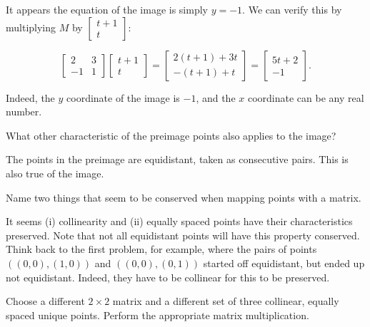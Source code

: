 \documentclass[../key.tex]{subfiles}
\begin{document}
It appears the equation of the image is simply $y=-1$. We can verify this by multiplying $M$ by $\begin{bmatrix} t+1 \\ t \end{bmatrix}$:

$$\begin{bmatrix} 2 & 3 \\ -1 & 1 \end{bmatrix} \begin{bmatrix} t+1 \\ t \end{bmatrix} = \begin{bmatrix} 2(t+1) + 3t \\ -(t+1) + t \end{bmatrix} = \begin{bmatrix} 5t + 2 \\ -1 \end{bmatrix}.$$

Indeed, the $y$ coordinate of the image is $-1$, and the $x$ coordinate can be any real number.

\begin{inner_problem}
\item What other characteristic of the preimage points also applies to the image?
\end{inner_problem}

The points in the preimage are equidistant, taken as consecutive pairs. This is also true of the image.

\begin{inner_problem}
\item Name two things that seem to be conserved when mapping points with a matrix.
\end{inner_problem}

It seems (i) collinearity and (ii) equally spaced points have their characteristics preserved. Note that not all equidistant points will have this property conserved. Think back to the first problem, for example, where the pairs of points $((0,0),(1,0))$ and $((0,0),(0,1))$ started off equidistant, but ended up not equidistant. Indeed, they have to be collinear for this to be preserved.

\begin{outer_problem}
\item
\end{outer_problem}

\begin{inner_problem}[start=1]
\item Choose a different $2\times 2$ matrix and a different set of three collinear, equally spaced unique points. Perform the appropriate matrix multiplication.
\end{inner_problem}
\end{document}
